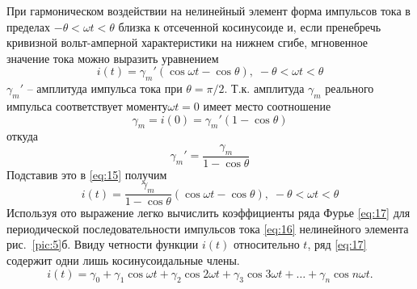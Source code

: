 При гармоническом воздействии на нелинейный элемент форма импульсов тока в пределах $-\theta<\omega t<\theta$ близка к отсеченной косинусоиде и, если пренебречь кривизной вольт-амперной характеристики на нижнем сгибе, мгновенное значение тока можно выразить уравнением
\begin{equation}
i(t)=\gamma_m'(\cos\omega t-\cos\theta),\;-\theta<\omega t<\theta
\label{eq:15}
\end{equation}
$\gamma_m'$ -- амплитуда импульса тока при $\theta=\pi/2$. 
Т.к. амплитуда $\gamma_m$ реального импульса соответствует моменту$\omega t=0$ имеет место соотношение
\begin{equation*}
\gamma_m=i(0)=\gamma_m'(1-\cos\theta)
\end{equation*}
откуда
\begin{equation*}
	\gamma_m'=\frac{\gamma_m}{1-\cos\theta}
\end{equation*}
Подставив это в \eqref{eq:15} получим
\begin{equation}
i(t)=\frac{\gamma_m}{1-\cos\theta}(\cos\omega t-\cos\theta),\;-\theta<\omega t<\theta
\label{eq:16}
\end{equation}
Используя ото выражение легко вычислить коэффициенты ряда Фурье \eqref{eq:17} для периодической последовательности импульсов тока \eqref{eq:16} нелинейного элемента рис.~\ref{pic:5}б. Ввиду четности функции $i(t)$ относительно $t$, ряд \eqref{eq:17} содержит одни лишь косинусоидальные члены.
\begin{equation}
i(t)=\gamma_0+\gamma_1\cos\omega t+\gamma_2\cos2\omega t+\gamma_3\cos3\omega t+\ldots+\gamma_n\cos n\omega t.
\label{eq:17}
\end{equation}
